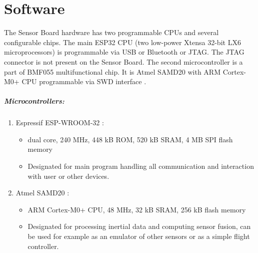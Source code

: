 \chapter{Software}
The Sensor Board hardware has two programmable CPUs and several configurable chips. The main ESP32 CPU (two low-power Xtensa 32-bit LX6 microprocessors) \cite{espressif:ESP-WROOM-32} is programmable via USB or Bluetooth or JTAG. The JTAG connector is not present on the Sensor Board. The second microcontroller is a part of BMF055 \cite{bosch:BMF055} multifunctional chip. It is Atmel SAMD20 \cite{atmel:SAMD20} with ARM Cortex-M0+ CPU programmable via SWD interface \cite{SWDinterface}.

\paragraph{Microcontrollers:}
\begin{enumerate}
	\item Espressif ESP-WROOM-32 \cite{espressif:ESP-WROOM-32}:
		\begin{itemize}
			\item dual core, 240 MHz, 448 kB ROM, 520 kB SRAM, 4 MB SPI flash memory
			\item Designated for main program handling all communication and interaction with user or other devices.
		\end{itemize}
	\item Atmel SAMD20 \cite{atmel:samd20}:
		\begin{itemize}
			\item ARM Cortex-M0+ CPU, 48 MHz, 32 kB SRAM, 256 kB flash memory
			\item Designated for processing inertial data and computing sensor fusion, can be used for example as an emulator of other sensors or as a simple flight controller.
		\end{itemize}
\end{enumerate}


